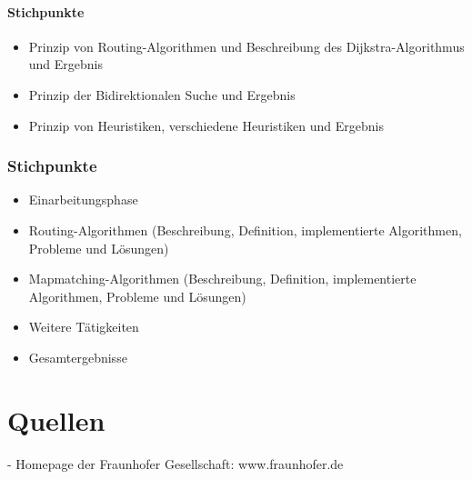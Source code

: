 \message{ !name(bericht.tex)}\documentclass[twoside, a4paper]{scrartcl}
\begin{document}
\paragraph{Stichpunkte}
\label{sec:stichpunkte-2}
\begin{itemize}
\item Prinzip von Routing-Algorithmen und Beschreibung des Dijkstra-Algorithmus und Ergebnis
\item Prinzip der Bidirektionalen Suche und Ergebnis
\item Prinzip von Heuristiken, verschiedene Heuristiken und Ergebnis
\end{itemize}


\subsubsection{Stichpunkte}
\label{sec:stichpunkte-1}

\begin{itemize}
\item Einarbeitungsphase
\item Routing-Algorithmen (Beschreibung, Definition, implementierte Algorithmen, Probleme und Lösungen)
\item Mapmatching-Algorithmen (Beschreibung, Definition, implementierte Algorithmen, Probleme und Lösungen)
\item Weitere Tätigkeiten
\item Gesamtergebnisse
\end{itemize}









\section{Quellen}
\label{sec:quellen}

- Homepage der Fraunhofer Gesellschaft: www.fraunhofer.de
\end{document}
